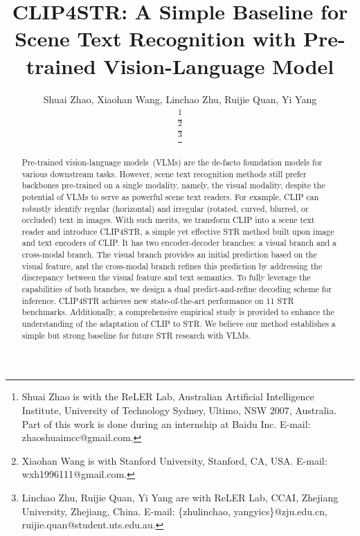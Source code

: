 \documentclass[lettersize,journal]{IEEEtran}
\begin{document}
\title{CLIP4STR: A Simple Baseline for Scene Text Recognition with Pre-trained Vision-Language Model}

\author{Shuai Zhao, Xiaohan Wang, Linchao Zhu, Ruijie Quan, Yi Yang

\thanks{
Shuai Zhao is with the ReLER Lab, Australian Artificial
Intelligence Institute, University of Technology Sydney, Ultimo, NSW 2007, Australia. Part of this work is done during an internship at Baidu Inc. E-mail: zhaoshuaimcc@gmail.com.}

\thanks{Xiaohan Wang is with Stanford University, Stanford, CA, USA. E-mail: wxh1996111@gmail.com.}

\thanks{ Linchao Zhu, Ruijie Quan, Yi Yang are with ReLER Lab, CCAI, Zhejiang University, Zhejiang, China. E-mail: \{zhulinchao, yangyics\}@zju.edu.cn, ruijie.quan@student.uts.edu.au.}
}



\maketitle

\begin{abstract}
Pre-trained vision-language models~(VLMs) are the de-facto foundation models for various downstream tasks.
However, scene text recognition methods still prefer backbones pre-trained on a single modality, namely, the visual modality, despite the potential of VLMs to serve as powerful scene text readers.
For example, CLIP can robustly identify regular (horizontal) and irregular (rotated, curved, blurred, or occluded) text in images.
With such merits, we transform CLIP into a scene text reader and introduce CLIP4STR,
a simple yet effective STR method
built upon image and text encoders of CLIP.
It has two encoder-decoder
branches: a visual branch and
a cross-modal branch.
The visual branch provides an initial prediction based on the visual feature,
and the cross-modal branch refines this prediction by addressing the discrepancy between the visual feature and text semantics.
To fully leverage the capabilities of both branches,
we design a dual predict-and-refine decoding scheme for inference.
CLIP4STR achieves new state-of-the-art performance on 11 STR benchmarks.
Additionally, a comprehensive empirical study
is provided to enhance the understanding of the adaptation of CLIP to STR.
We believe our method establishes a simple but strong baseline for future STR research with VLMs.
\end{abstract}
\end{document}
